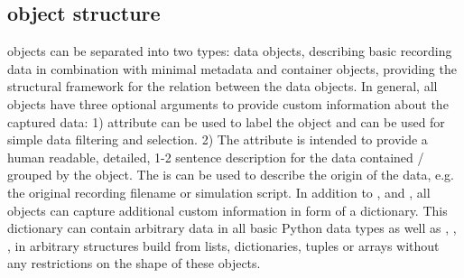 \subsection{ object structure}
 objects can be separated into two types: data objects, describing basic recording data in combination with minimal metadata and container objects, providing the structural framework for the relation between the data objects. In general, all  objects have three optional arguments to provide custom information about the captured data: 1)  attribute can be used to label the object and can be used for simple data filtering and selection. 2) The  attribute is intended to provide a human readable, detailed, 1-2 sentence description for the data contained / grouped by the  object. The  is can be used to describe the origin of the data, e.g. the original recording filename or simulation script. In addition to ,  and , all  objects can capture additional custom information in form of a  dictionary. This dictionary can contain arbitrary data in all basic Python data types as well as , , ,  in arbitrary structures build from lists, dictionaries, tuples or  arrays without any restrictions on the shape of these objects.


